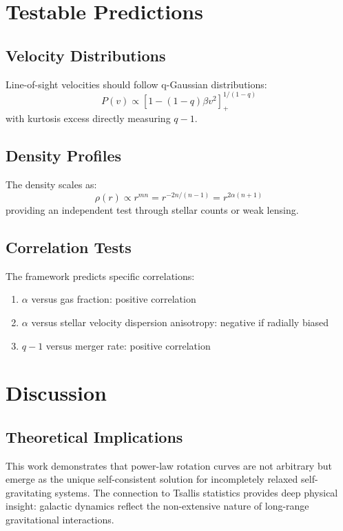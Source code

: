 \documentclass[12pt, a4paper]{article}
\theoremstyle{definition}
\theoremstyle{remark}
\begin{document}
\section{Testable Predictions}

\subsection{Velocity Distributions}
Line-of-sight velocities should follow q-Gaussian distributions:
\begin{equation}
P(v) \propto [1 - (1-q)\beta v^2]_+^{1/(1-q)}
\end{equation}
with kurtosis excess directly measuring $q-1$.

\subsection{Density Profiles}
The density scales as:
\begin{equation}
\rho(r) \propto r^{mn} = r^{-2n/(n-1)} = r^{2\alpha(n+1)}
\end{equation}
providing an independent test through stellar counts or weak lensing.

\subsection{Correlation Tests}
The framework predicts specific correlations:
\begin{enumerate}
\item $\alpha$ versus gas fraction: positive correlation
\item $\alpha$ versus stellar velocity dispersion anisotropy: negative if radially biased
\item $q-1$ versus merger rate: positive correlation
\end{enumerate}

\section{Discussion}

\subsection{Theoretical Implications}

This work demonstrates that power-law rotation curves are not arbitrary but emerge as the unique self-consistent solution for incompletely relaxed self-gravitating systems. The connection to Tsallis statistics provides deep physical insight: galactic dynamics reflect the non-extensive nature of long-range gravitational interactions.
\end{document}
